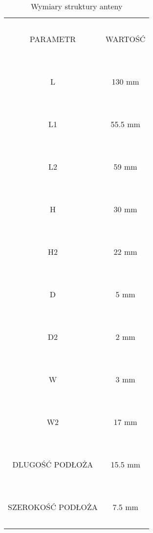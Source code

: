\newpage
\begin{table}[h!]
\begin{center}
    \begin{tabular}{|c|c|}
    \hline
    ~                 & ~       \\
    PARAMETR          & WARTOŚĆ \\
    ~                 & ~       \\ \hline
    ~                 & ~       \\
    L                 & 130 mm  \\
    ~                 & ~       \\ \hline
    ~                 & ~       \\
    L1                & 55.5 mm \\
    ~                 & ~       \\ \hline
    ~                 & ~       \\
    L2                & 59 mm   \\
    ~                 & ~       \\ \hline
    ~                 & ~       \\
    H                 & 30 mm   \\
    ~                 & ~       \\ \hline
    ~                 & ~       \\
    H2                & 22 mm   \\
    ~                 & ~       \\ \hline
    ~                 & ~       \\
    D                 & 5 mm    \\
    ~                 & ~       \\ \hline
    ~                 & ~       \\
    D2                & 2 mm    \\
    ~                 & ~       \\ \hline
    ~                 & ~       \\
    W                 & 3 mm    \\
    ~                 & ~       \\ \hline
    ~                 & ~       \\
    W2                & 17 mm   \\
    ~                 & ~       \\ \hline
    ~                 & ~       \\
    DLUGOŚĆ PODŁOŻA   & 15.5 mm \\
    ~                 & ~       \\ \hline
    ~                 & ~       \\
    SZEROKOŚĆ PODŁOŻA & 7.5 mm  \\
    ~                 & ~       \\ \hline
    \end{tabular}
	\caption{Wymiary struktury anteny}
\end{center}
\end{table}


